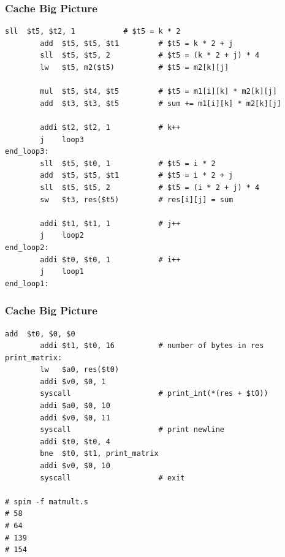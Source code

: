 \documentclass{beamer}
\begin{document}
\begin{frame}[fragile]
\frametitle{Cache Big Picture}
\tiny
\begin{lstlisting}[firstnumber=28, linebackgroundcolor={\lstcolorlines{31, 42}}]
        sll  $t5, $t2, 1           # $t5 = k * 2
        add  $t5, $t5, $t1         # $t5 = k * 2 + j
        sll  $t5, $t5, 2           # $t5 = (k * 2 + j) * 4
        lw   $t5, m2($t5)          # $t5 = m2[k][j]

        mul  $t5, $t4, $t5         # $t5 = m1[i][k] * m2[k][j]
        add  $t3, $t3, $t5         # sum += m1[i][k] * m2[k][j]

        addi $t2, $t2, 1           # k++
        j    loop3
end_loop3:
        sll  $t5, $t0, 1           # $t5 = i * 2
        add  $t5, $t5, $t1         # $t5 = i * 2 + j
        sll  $t5, $t5, 2           # $t5 = (i * 2 + j) * 4
        sw   $t3, res($t5)         # res[i][j] = sum

        addi $t1, $t1, 1           # j++
        j    loop2
end_loop2:
        addi $t0, $t0, 1           # i++
        j    loop1
end_loop1:
\end{lstlisting}

\end{frame}

\begin{frame}[fragile]
\frametitle{Cache Big Picture}
\tiny
\begin{lstlisting}[firstnumber=50]
        add  $t0, $0, $0
        addi $t1, $t0, 16          # number of bytes in res
print_matrix:
        lw   $a0, res($t0)
        addi $v0, $0, 1
        syscall                    # print_int(*(res + $t0))
        addi $a0, $0, 10
        addi $v0, $0, 11
        syscall                    # print newline
        addi $t0, $t0, 4
        bne  $t0, $t1, print_matrix
        addi $v0, $0, 10
        syscall                    # exit

# spim -f matmult.s
# 58
# 64
# 139
# 154
\end{lstlisting}

\end{frame}
\end{document}

